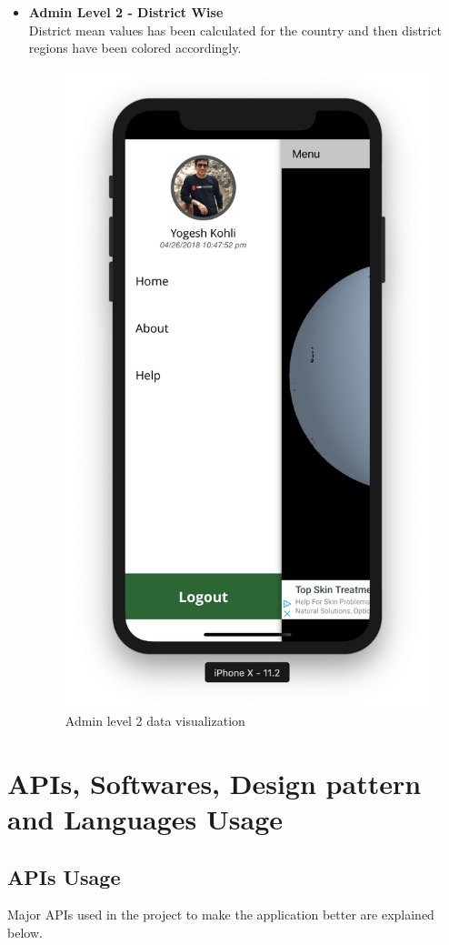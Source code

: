 \begin{itemize}
    \item \textbf{Admin Level 2 - District Wise} \\
    District mean values has been calculated for the country and then district regions have been colored accordingly.
    
     \begin{figure}[H]
            \centering
            \includegraphics[width=0.25\linewidth]{figures/ch4/side_menu.png}
            \caption{\label{fig:admin_level_2_visual}  Admin level 2 data visualization}
        \end{figure}
    
\end{itemize}


\section{APIs, Softwares, Design pattern and Languages Usage}

\subsection{APIs Usage}

Major APIs used in the project to make the application better are explained below.

